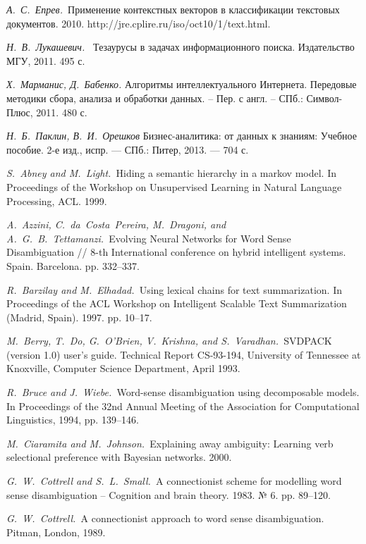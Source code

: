 \documentclass{article}
\begin{document}
\begin{articletext}
\begin{thebibliography}{9}
\textit{А.~С.~Епрев.~}Применение контекстных векторов в классификации текстовых документов. 2010. http://jre.cplire.ru/iso/oct10/1/text.html.

\textit{Н.~В.~Лукашевич.~} Тезаурусы в задачах информационного поиска. Издательство МГУ, 2011. 495 с.

\textit{Х.~Марманис, Д.~Бабенко.} Алгоритмы интеллектуального Интернета. Передовые методики сбора, анализа и обработки данных. – Пер. с англ. – СПб.: Символ-Плюс, 2011. 480 с.

\textit{Н.~Б.~Паклин, В.~И.~Орешков} Бизнес-аналитика: от данных к знаниям: Учебное пособие. 2-е изд., испр. --- СПб.: Питер, 2013. --- 704 с.

\textit{S.~Abney and M.~Light.~}Hiding a semantic hierarchy in a markov model. In Proceedings of the Workshop on Unsupervised Learning in Natural Language Processing, ACL. 1999.

\textit{A.~Azzini, C.~da~Costa~Pereira, M.~Dragoni, and A.~G.~B.~Tettamanzi.~}Evolving Neural Networks for Word Sense Disambiguation // 8-th International conference on hybrid intelligent systems. Spain. Barcelona. pp. 332–337.

\textit{R.~Barzilay and M.~Elhadad.~}Using lexical chains for text summarization. In Proceedings of the ACL Workshop on Intelligent Scalable Text Summarization (Madrid, Spain). 1997. pp. 10–17.

\textit{M.~Berry, T.~Do, G.~O’Brien, V.~Krishna, and S.~Varadhan.~}SVDPACK (version 1.0) user’s guide. Technical Report CS-93-194, University of Tennessee at Knoxville, Computer Science Department, April 1993.

\textit{R.~Bruce and J.~Wiebe.~}Word-sense disambiguation using decomposable models. In Proceedings of the 32nd Annual Meeting of the Association for Computational Linguistics, 1994, pp. 139–146.

\textit{M.~Ciaramita and M.~Johnson.~}Explaining away ambiguity: Learning verb selectional preference with Bayesian networks. 2000. 

\textit{G.~W.~Cottrell and S.~L.~Small.~}A connectionist  scheme for modelling word  sense  disambiguation -- Cognition and brain theory. 1983. № 6. pp. 89–120. 

\textit{G.~W.~Cottrell.~}A connectionist approach to word sense disambiguation. Pitman, London, 1989.


\end{thebibliography}
\end{articletext}
\end{document}
